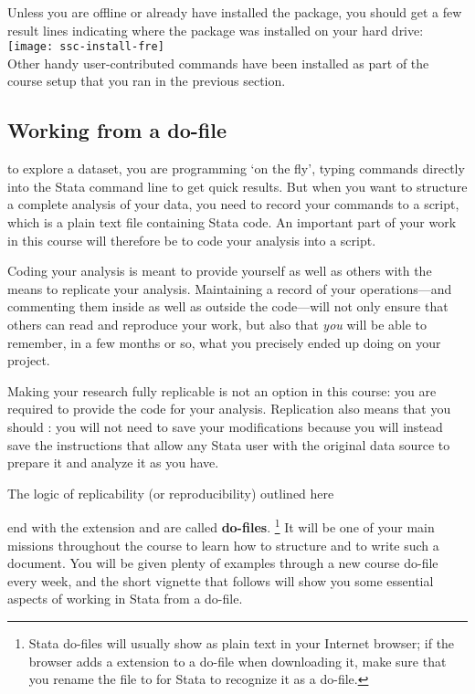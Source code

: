 \begin{description}
	Unless you are offline or already have installed the  package, you should get a few result lines indicating where the package was installed on your hard drive:\\[1em]%
		
	\texttt{[image: ssc-install-fre]}\\[1em]
		
	Other handy user-contributed commands have been installed as part of the course setup that you ran in the previous section.%
\end{description}

	\subsection{Working from a do-file}%
		\label{sec:do-files}%

	 to explore a dataset, you are programming `on the fly', typing commands directly into the Stata command line to get quick results. But when you want to structure a complete analysis of your data, you need to record your commands to a script, which is a plain text file containing Stata code. An important part of your work in this course will therefore be to code your analysis into a script.%
	
	Coding your analysis is meant to provide yourself as well as others with the means to replicate your analysis. Maintaining a record of your operations—and commenting them inside as well as outside the code—will not only ensure that others can read and reproduce your work, but also that \emph{you} will be able to remember, in a few months or so, what you precisely ended up doing on your project.%
	
	Making your research fully replicable is not an option in this course: you are required to provide the code for your analysis. Replication also means that you should : you will not need to save your modifications because you will instead save the instructions that allow any Stata user with the original data source to prepare it and analyze it as you have.%
	
	The logic of replicability (or reproducibility) outlined here 
	
	 end with the  extension and are called \textbf{do-files}.%
		 \footnote{Stata do-files will usually show as plain text in your Internet browser; if the browser adds a  extension to a do-file when downloading it, make sure that you rename the file to  for Stata to recognize it as a do-file.} %
		It will be one of your main missions throughout the course to learn how to structure and to write such a document. You will be given plenty of examples through a new course do-file every week, and the short vignette that follows will show you some essential aspects of working in Stata from a do-file.%
		
